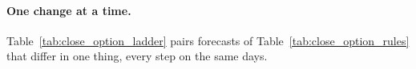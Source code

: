 \paragraph{One change at a time.} Table~\ref{tab:close_option_ladder} pairs forecasts of
Table~\ref{tab:close_option_rules} that differ in one thing, every step on the same days.
